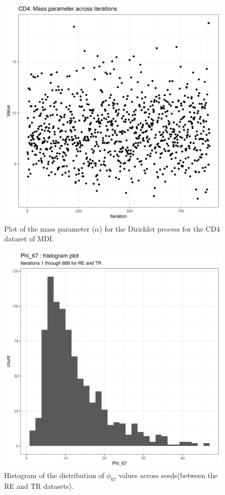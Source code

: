 \documentclass[12pt]{article} %
\begin{document}
	\newpage
	
	\begin{figure}[h]
		\centering
		\includegraphics[scale=0.75]{Images/Biology_data/All_datasets/Mass_parameter_plots/CD4.png}
		\caption{Plot of the mass parameter ($\alpha$) for the Dirichlet process for the CD4 dataset of MDI.}
		\label{fig:mdi_cd4_mass_parameter_plot}
	\end{figure}
	
	\newpage
	
	\begin{figure}[h]
		\centering
		\includegraphics[scale=0.75]{Images/Biology_data/All_datasets/Phi_histograms/Phi_67_histogram_plot.png}
		\caption{Histogram of the distribution of $\phi_{67}$ values across seeds(between the RE and TR datasets).}
		\label{fig:mdi_re_tr_phi_histogram}
	\end{figure}
\end{document}
